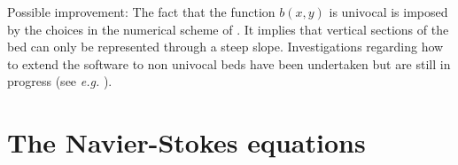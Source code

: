 \begin{CommentBlock}{Possible improvement:}
  The fact that the function $b(x,y)$ is univocal is imposed by the choices in the numerical
  scheme of . It implies that vertical sections of the bed can only be
  represented through a steep slope. Investigations regarding how to extend the 
  software to non univocal beds have been undertaken but are still in progress
  (see \textit{e.g.} \cite{Wang2016}).
\end{CommentBlock}

\section{The Navier-Stokes equations}

